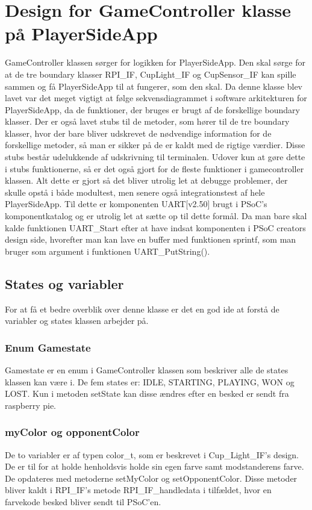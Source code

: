 \documentclass[Softwaredesign/Softwaredesign_main.tex]{subfiles}
\begin{document}
\section{Design for GameController klasse på PlayerSideApp}\label{sec:GameController_design_bilag}
GameController klassen sørger for logikken for PlayerSideApp. Den skal sørge for at de tre boundary klasser RPI\_IF, CupLight\_IF og CupSensor\_IF kan spille sammen og få PlayerSideApp til at fungerer, som den skal. Da denne klasse blev lavet var det meget vigtigt at følge sekvensdiagrammet i software arkitekturen for PlayerSideApp, da de funktioner, der bruges er brugt af de forskellige boundary klasser. Der er også lavet stubs til de metoder, som hører til de tre boundary klasser, hvor der bare bliver udskrevet de nødvendige information for de forskellige metoder, så man er sikker på de er kaldt med de rigtige værdier. Disse stubs består udelukkende af udskrivning til terminalen. Udover kun at gøre dette i stubs funktionerne, så er det også gjort for de fleste funktioner i gamecontroller klassen. Alt dette er gjort så det bliver utrolig let at debugge problemer, der skulle opstå i både modultest, men senere også integrationstest af hele PlayerSideApp. Til dette er komponenten UART[v2.50] brugt i PSoC's komponentkatalog og er utrolig let at sætte op til dette formål. Da man bare skal kalde funktionen UART\_Start efter at have indsat komponenten i PSoC creators design side, hvorefter man kan lave en buffer med funktionen sprintf, som man bruger som argument i funktionen UART\_PutString(). 
\subsection{States og variabler}
For at få et bedre overblik over denne klasse er det en god ide at forstå de variabler og states klassen arbejder på.
\subsubsection{Enum Gamestate}
Gamestate er en enum i GameController klassen som beskriver alle de states klassen kan være i. De fem states er: IDLE, STARTING, PLAYING, WON og LOST. Kun i metoden setState kan disse ændres efter en besked er sendt fra raspberry pie.
\subsubsection{myColor og opponentColor}
De to variabler er af typen color\_t, som er beskrevet i Cup\_Light\_IF's design. De er til for at holde henholdsvis holde sin egen farve samt modstanderens farve. De opdateres med metoderne setMyColor og setOpponentColor. Disse metoder bliver kaldt i RPI\_IF's metode RPI\_IF\_handledata i tilfældet, hvor en farvekode besked bliver sendt til PSoC'en. 
\end{document}
